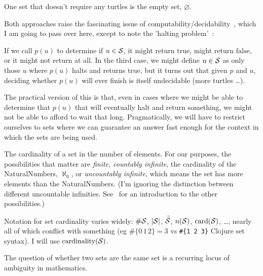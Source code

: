 One set that doesn't require any turtles is 
the empty set, $\varnothing$.


Both approaches raise the fascinating issue of 
computability/decidability~\cite{church1936unsolvable,
turing1936computability,
turing1938computable-correction,
turing1937computability-lambda},
which I am going to pass over here, except to note the 
'halting problem'~\cite{wiki:Halting-problem}:

If we call $p(u)$ to determine if $u \in \mathcal{S}$, 
it might return $\text{true}$, might return $\text{false}$,
or it might not return at all.
In the third case, we might define $u \in \mathcal{S}$ as only those
$u$ where $p(u)$ halts and returns $\text{true}$, but it turns 
out that given $p$ and $u$, deciding whether $p(u)$ will ever
finish is itself undecidable (more turtles \ldots).

The practical version of this is that, even in cases where we
might be able to determine that $p(u)$ that will eventually halt
and return something, we might not be able to afford to wait that
long.
Pragmatically, we will have to restrict ourselves to sets where we
can guarantee an answer fast enough for the context in which the
sets are being used.


The cardinality of a set in the number of elements.
For our purposes, the possibilities that matter are \emph{finite,}
\emph{countably infinite}, the cardinality of the
\gls{NaturalNumbers}, $\aleph_{0}$, or \emph{uncountably
infinite}, which means the set has more elements than the
\gls{NaturalNumbers}.
(I'm ignoring the distinction between different uncountable
infinities.
See~\cite{wiki:cardinal-number} for an introduction to the other
possibilities.)

Notation for set cardinality varies widely:
$\#\mathcal{S}$,  $|\mathcal{S}|$,
$\bar{\bar{\mathcal{S}}}$, $n(\mathcal{S})$,
$\text{card}(\mathcal{S})$, \ldots, nearly all of which conflict
with something (eg $\#\{ 0 \, 1 \, 2 \} = 3$ vs 
\lstinline|#{1 2 3}| Clojure set syntax).
I will use $\text{cardinality}(\mathcal{S})$.


The question of whether two sets are the same set is a recurring
locus of ambiguity in mathematics.


